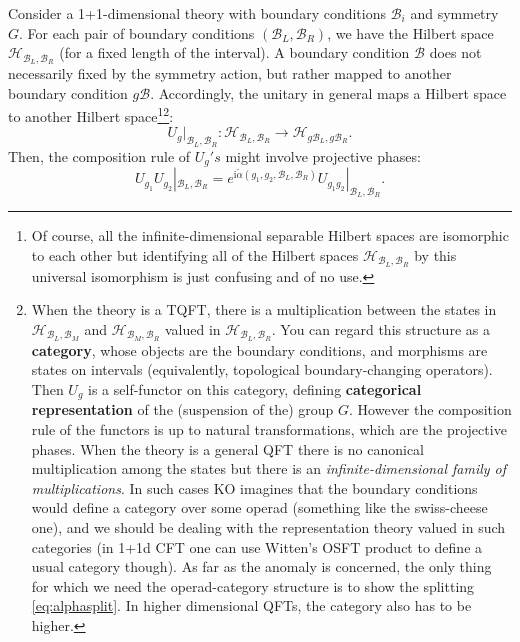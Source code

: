 \documentclass[
]{scrartcl}
\numberwithin{equation}{section}
\theoremstyle{definition}
\theoremstyle{definition}
\theoremstyle{definition}
\theoremstyle{definition}
\theoremstyle{remark}
\begin{document}
Consider a 1+1-dimensional theory with boundary conditions \(\mathcal{B}_i\)
and symmetry \(G\).
For each pair of boundary conditions \((\mathcal{B}_L,\mathcal{B}_R)\), we have the Hilbert space \(\mathcal{H}_{\mathcal{B}_L,\mathcal{B}_R}\) (for a fixed length of the interval).
A boundary condition \(\mathcal{B}\) does not necessarily fixed by the symmetry action, but rather mapped to another boundary condition \(g\mathcal{B}\).
Accordingly, the unitary in general maps a Hilbert space to another Hilbert space\footnote{Of course, all the infinite-dimensional separable Hilbert spaces are isomorphic to each other but identifying all of the Hilbert spaces \(\mathcal{H}_{\mathcal{B}_L,\mathcal{B}_R}\) by this universal isomorphism is just confusing and of no use.}\footnote{When the theory is a TQFT, there is a multiplication between the states in \(\mathcal{H}_{\mathcal{B}_L,\mathcal{B}_M}\) and \(\mathcal{H}_{\mathcal{B}_M,\mathcal{B}_R}\) valued in \(\mathcal{H}_{\mathcal{B}_L,\mathcal{B}_R}\). You can regard this structure as a \textbf{category}, whose objects are the boundary conditions, and morphisms are states on intervals (equivalently, topological boundary-changing operators).
  Then \(U_g\) is a self-functor on this category, defining \textbf{categorical representation} of the (suspension of the) group \(G\).
  However the composition rule of the functors is up to natural transformations, which are the projective phases.
  When the theory is a general QFT there is no canonical multiplication among the states but there is an \emph{infinite-dimensional family of multiplications}. In such cases KO imagines that the boundary conditions would define a category over some operad (something like the swiss-cheese one), and we should be dealing with the representation theory valued in such categories (in 1+1d CFT one can use Witten's OSFT product to define a usual category though).
  As far as the anomaly is concerned, the only thing for which we need the operad-category structure is to show the splitting \eqref{eq:alphasplit}.
  In higher dimensional QFTs, the category also has to be higher.}:
\begin{equation}
    \label{eq:UgB}
    U_g|_{\mathcal{B}_L,\mathcal{B}_R} : \mathcal{H}_{\mathcal{B}_L,\mathcal{B}_R} \to \mathcal{H}_{g\mathcal{B}_L,g\mathcal{B}_R}.
\end{equation}
Then, the composition rule of \(U_g's\) might involve projective phases:
\begin{equation}
    \label{eq:UBproj}
    U_{g_1}U_{g_2}|_{\mathcal{B}_L,\mathcal{B}_R} = e^{\mathrm{i}\tilde{\alpha}(g_1,g_2,\mathcal{B}_L,\mathcal{B}_R)}U_{g_1g_2}|_{\mathcal{B}_L,\mathcal{B}_R}.
\end{equation}
\end{document}
